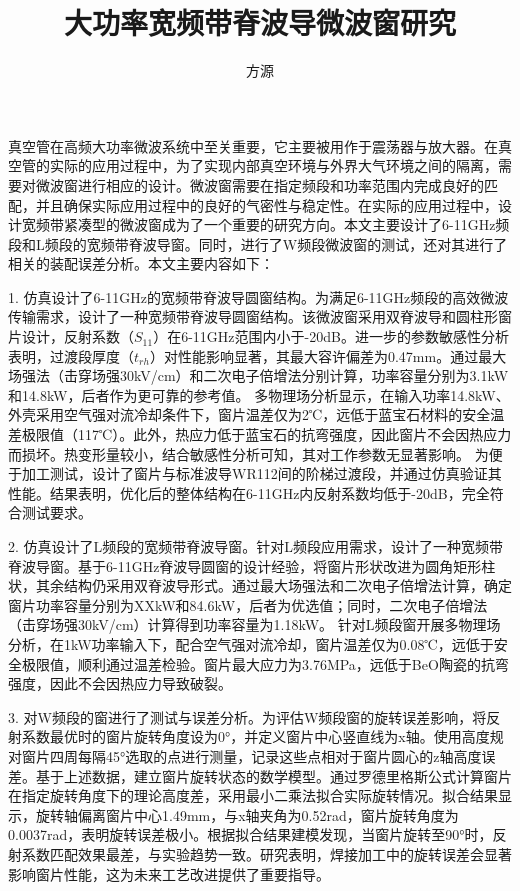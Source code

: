 \documentclass[master]{thesis-uestc}
\title{大功率宽频带脊波导微波窗研究}{Research on High-Power Broadband Ridge Waveguide Microwave Window} %
\author{方源}{Fang Yuan} %
\begin{document}
\makecover %
\originalitydeclaration %
\begin{chineseabstract}
    真空管在高频大功率微波系统中至关重要，它主要被用作于震荡器与放大器。在真空管的实际的应用过程中，为了实现内部真空环境与外界大气环境之间的隔离，需要对微波窗进行相应的设计。微波窗需要在指定频段和功率范围内完成良好的匹配，并且确保实际应用过程中的良好的气密性与稳定性。在实际的应用过程中，设计宽频带紧凑型的微波窗成为了一个重要的研究方向。本文主要设计了6-11GHz频段和L频段的宽频带脊波导窗。同时，进行了W频段微波窗的测试，还对其进行了相关的装配误差分析。本文主要内容如下：

    1. 仿真设计了6-11GHz的宽频带脊波导圆窗结构。为满足6-11GHz频段的高效微波传输需求，设计了一种宽频带脊波导圆窗结构。该微波窗采用双脊波导和圆柱形窗片设计，反射系数（\(S_{11}\)）在6-11GHz范围内小于-20dB。进一步的参数敏感性分析表明，过渡段厚度（\(t_{rh}\)）对性能影响显著，其最大容许偏差为0.47mm。通过最大场强法（击穿场强30kV/cm）和二次电子倍增法分别计算，功率容量分别为3.1kW和14.8kW，后者作为更可靠的参考值。
    多物理场分析显示，在输入功率14.8kW、外壳采用空气强对流冷却条件下，窗片温差仅为2℃，远低于蓝宝石材料的安全温差极限值（117℃）。此外，热应力低于蓝宝石的抗弯强度，因此窗片不会因热应力而损坏。热变形量较小，结合敏感性分析可知，其对工作参数无显著影响。    
    为便于加工测试，设计了窗片与标准波导WR112间的阶梯过渡段，并通过仿真验证其性能。结果表明，优化后的整体结构在6-11GHz内反射系数均低于-20dB，完全符合测试要求。

    2. 仿真设计了L频段的宽频带脊波导窗。针对L频段应用需求，设计了一种宽频带脊波导窗。基于6-11GHz脊波导圆窗的设计经验，将窗片形状改进为圆角矩形柱状，其余结构仍采用双脊波导形式。通过最大场强法和二次电子倍增法计算，确定窗片功率容量分别为XXkW和84.6kW，后者为优选值；同时，二次电子倍增法（击穿场强30kV/cm）计算得到功率容量为1.18kW。
    针对L频段窗开展多物理场分析，在1kW功率输入下，配合空气强对流冷却，窗片温差仅为0.08℃，远低于安全极限值，顺利通过温差检验。窗片最大应力为3.76MPa，远低于BeO陶瓷的抗弯强度，因此不会因热应力导致破裂。

    3. 对W频段的窗进行了测试与误差分析。为评估W频段窗的旋转误差影响，将反射系数最优时的窗片旋转角度设为0°，并定义窗片中心竖直线为x轴。使用高度规对窗片四周每隔45°选取的点进行测量，记录这些点相对于窗片圆心的z轴高度误差。基于上述数据，建立窗片旋转状态的数学模型。通过罗德里格斯公式计算窗片在指定旋转角度下的理论高度差，采用最小二乘法拟合实际旋转情况。拟合结果显示，旋转轴偏离窗片中心1.49mm，与x轴夹角为0.52rad，窗片旋转角度为0.0037rad，表明旋转误差极小。根据拟合结果建模发现，当窗片旋转至90°时，反射系数匹配效果最差，与实验趋势一致。研究表明，焊接加工中的旋转误差会显著影响窗片性能，这为未来工艺改进提供了重要指导。

\end{chineseabstract}
\end{document}
